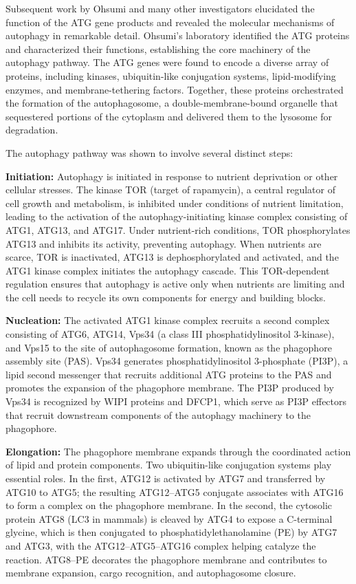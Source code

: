Subsequent work by Ohsumi and many other investigators elucidated the function of the ATG gene products and revealed the molecular mechanisms of autophagy in remarkable detail. Ohsumi's laboratory identified the ATG proteins and characterized their functions, establishing the core machinery of the autophagy pathway. The ATG genes were found to encode a diverse array of proteins, including kinases, ubiquitin-like conjugation systems, lipid-modifying enzymes, and membrane-tethering factors. Together, these proteins orchestrated the formation of the autophagosome, a double-membrane-bound organelle that sequestered portions of the cytoplasm and delivered them to the lysosome for degradation.

The autophagy pathway was shown to involve several distinct steps:

\textbf{Initiation:} Autophagy is initiated in response to nutrient deprivation or other cellular stresses. The kinase TOR (target of rapamycin), a central regulator of cell growth and metabolism, is inhibited under conditions of nutrient limitation, leading to the activation of the autophagy-initiating kinase complex consisting of ATG1, ATG13, and ATG17. Under nutrient-rich conditions, TOR phosphorylates ATG13 and inhibits its activity, preventing autophagy. When nutrients are scarce, TOR is inactivated, ATG13 is dephosphorylated and activated, and the ATG1 kinase complex initiates the autophagy cascade. This TOR-dependent regulation ensures that autophagy is active only when nutrients are limiting and the cell needs to recycle its own components for energy and building blocks.

\textbf{Nucleation:} The activated ATG1 kinase complex recruits a second complex consisting of ATG6, ATG14, Vps34 (a class III phosphatidylinositol 3-kinase), and Vps15 to the site of autophagosome formation, known as the phagophore assembly site (PAS). Vps34 generates phosphatidylinositol 3-phosphate (PI3P), a lipid second messenger that recruits additional ATG proteins to the PAS and promotes the expansion of the phagophore membrane. The PI3P produced by Vps34 is recognized by WIPI proteins and DFCP1, which serve as PI3P effectors that recruit downstream components of the autophagy machinery to the phagophore.

\textbf{Elongation:} The phagophore membrane expands through the coordinated action of lipid and protein components. Two ubiquitin-like conjugation systems play essential roles. In the first, ATG12 is activated by ATG7 and transferred by ATG10 to ATG5; the resulting ATG12--ATG5 conjugate associates with ATG16 to form a complex on the phagophore membrane. In the second, the cytosolic protein ATG8 (LC3 in mammals) is cleaved by ATG4 to expose a C-terminal glycine, which is then conjugated to phosphatidylethanolamine (PE) by ATG7 and ATG3, with the ATG12--ATG5--ATG16 complex helping catalyze the reaction. ATG8--PE decorates the phagophore membrane and contributes to membrane expansion, cargo recognition, and autophagosome closure.

